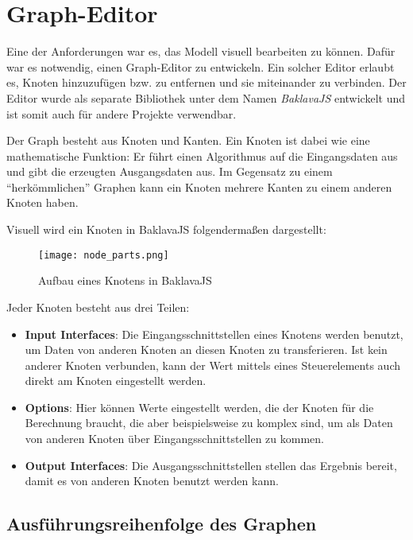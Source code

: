 
\chapter{Graph-Editor}
\label{sec:grapheditor}

Eine der Anforderungen war es, das Modell visuell bearbeiten zu können. Dafür war es notwendig, einen Graph-Editor zu entwickeln. Ein solcher Editor erlaubt es, Knoten hinzuzufügen bzw. zu entfernen und sie miteinander zu verbinden. Der Editor wurde als separate Bibliothek unter dem Namen \textit{BaklavaJS} entwickelt und ist somit auch für andere Projekte verwendbar.

Der Graph besteht aus Knoten und Kanten. Ein Knoten ist dabei wie eine mathematische Funktion: Er führt einen Algorithmus auf die Eingangsdaten aus und gibt die erzeugten Ausgangsdaten aus. Im Gegensatz zu einem \enquote{herkömmlichen} Graphen kann ein Knoten mehrere Kanten zu einem anderen Knoten haben.

Visuell wird ein Knoten in BaklavaJS folgendermaßen dargestellt:

\begin{figure}[H]
    \centering
    \texttt{[image: node\_parts.png]}
    \caption{Aufbau eines Knotens in BaklavaJS}
    \label{fig:nodeparts}
\end{figure}

Jeder Knoten besteht aus drei Teilen:
\begin{itemize}
    \item \textbf{Input Interfaces}: Die Eingangsschnittstellen eines Knotens werden benutzt, um Daten von anderen Knoten an diesen Knoten zu transferieren. Ist kein anderer Knoten verbunden, kann der Wert mittels eines Steuerelements auch direkt am Knoten eingestellt werden.
    \item \textbf{Options}: Hier können Werte eingestellt werden, die der Knoten für die Berechnung braucht, die aber beispielsweise zu komplex sind, um als Daten von anderen Knoten über Eingangsschnittstellen zu kommen.
    \item \textbf{Output Interfaces}: Die Ausgangsschnittstellen stellen das Ergebnis bereit, damit es von anderen Knoten benutzt werden kann.
\end{itemize}

\section{Ausführungsreihenfolge des Graphen}

